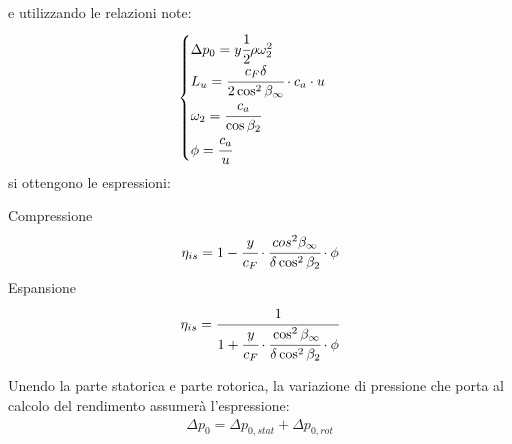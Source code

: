 e utilizzando le relazioni note:
\begin{align*}
\begin{cases}
\Delta p_0 = y \cfrac{1}{2} \rho \omega_2^2\\
L_u = \cfrac{c_F \delta}{2 \cos^2 \beta_{\infty}} \cdot c_a \cdot u\\
\omega_2 = \cfrac{c_a}{\cos \beta_2}\\
\phi = \cfrac{c_a}{u}
\end{cases}
\end{align*}
si ottengono le espressioni:
\begin{multicols}{2}
Compressione
\begin{align*}
\eta_{is} = 1- \cfrac{y}{c_F} \cdot  \cfrac{cos^2 \beta_{\infty}}{\delta \cos^2 \beta_2} \cdot \phi
\end{align*}
\break
Espansione
\begin{align*}
\eta_{is} = \cfrac{1}{1+\cfrac{y}{c_F} \cdot \cfrac{\cos^2 \beta_{\infty}}{\delta \cos^2 \beta_2} \cdot \phi}
\end{align*}
\end{multicols}
Unendo la parte statorica e parte rotorica, la variazione di pressione che porta al calcolo del rendimento assumerà l'espressione:
\begin{align*}
\Delta p_0 = \Delta p_{0,stat} + \Delta p_{0,rot}
\end{align*}
